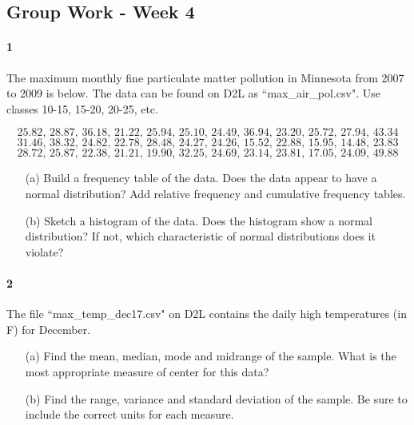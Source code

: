 \documentclass{article}
\begin{document}
\begin{flushleft}
\section*{Group Work - Week 4}
\paragraph{1} The maximum monthly fine particulate matter pollution in Minnesota from 2007 to 2009 is below. The data can be found on D2L as ``max\_air\_pol.csv". Use classes 10-15, 15-20, 20-25, etc. 

\[  25.82 ,\,  28.87 ,\, 36.18 ,\, 21.22 ,\, 25.94 ,\, 25.10 ,\, 24.49 ,\, 36.94 ,\, 23.20 ,\, 25.72 ,\, 27.94 ,\, 43.34 \] 
\[31.46 ,\, 38.32 ,\, 24.82 ,\, 22.78 ,\, 28.48 ,\, 24.27 ,\, 24.26 ,\, 15.52 ,\, 22.88 ,\, 15.95 ,\, 14.48 ,\, 23.83 \]
\[ 28.72 ,\, 25.87 ,\, 22.38 ,\, 21.21 ,\, 19.90 ,\, 32.25 ,\, 24.69 ,\, 23.14 ,\, 23.81 ,\, 17.05 ,\, 24.09 ,\, 49.88 \]
\begin{itemize}
\item [(a)] Build a frequency table of the data. Does the data appear to have a normal distribution? Add relative frequency and cumulative frequency tables.
\vspace{3in}
\item[(b)] Sketch a histogram of the data. Does the histogram show a normal distribution? If not, which characteristic of normal distributions does it violate?
\end{itemize}


\newpage
\paragraph{2} The file ``max\_temp\_dec17.csv" on D2L contains the daily high temperatures (in F) for December. 
\begin{itemize}
\item [(a)] Find the mean, median, mode and midrange of the sample. What is the most appropriate measure of center for this data?
\vspace{3in}
\item[(b)] Find the range, variance and standard deviation of the sample. Be sure to include the correct units for each measure.
\vspace{3in}

\end{itemize}


\newpage

\end{flushleft}
\end{document}
